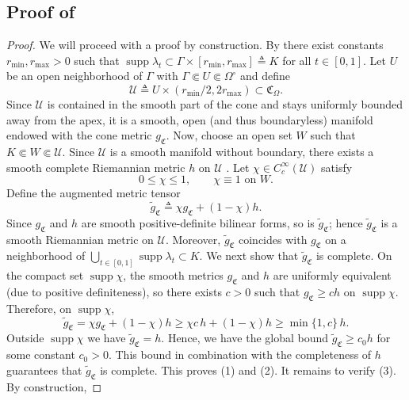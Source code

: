 \documentclass[11pt]{article}
\begin{document}
\subsection{Proof of } \label{sec: proof of cone ambient manifold}
\begin{proof}
    We will proceed with a proof by construction. By  there exist constants $r_{\min}, r_{\max} > 0$ such that $\operatorname{supp} \lambda_t \subset \Gamma \times[r_{\min}, r_{\max}] \triangleq K$ for all $t \in [0,1]$. Let $U$ be an open neighborhood of $\Gamma$ with $\Gamma \Subset U \Subset \Omega^\circ$ and define 
    \[\mathcal{U} \triangleq U \times (r_{\min}/2,2 r_{\max}) \subset \mathfrak{C}_\Omega.\]
    Since $\mathcal{U}$ is contained in the smooth part of the cone and stays uniformly bounded away from the apex, it is a smooth, open (and thus boundaryless) manifold endowed with the cone metric $g_\mathfrak{C}$. Now, choose an open set $W$ such that $K \Subset W \Subset \mathcal U$. Since $\mathcal U$ is a smooth manifold without boundary, there exists a smooth complete
    Riemannian metric $h$ on $\mathcal U$ \citep{nomizu1961existence}. Let $\chi \in C_c^\infty(\mathcal U)$ satisfy
    \[
    0 \leq \chi \leq 1, \qquad \chi \equiv 1 \text{ on } W.
    \]
    Define the augmented metric tensor
    \[
    \widetilde g_{\mathfrak C} \triangleq \chi g_{\mathfrak C} + (1-\chi)h.
    \]
    Since $g_{\mathfrak C}$ and $h$ are smooth positive-definite bilinear forms, so is
    $\widetilde g_{\mathfrak C}$; hence $\widetilde g_{\mathfrak C}$ is a smooth Riemannian metric
    on $\mathcal U$. Moreover, $\widetilde g_\mathfrak{C}$ coincides with $g_\mathfrak{C}$ on  a neighborhood of
    $\bigcup_{t\in[0,1]}\operatorname{supp}\lambda_t \subset K$. We next show that $\widetilde g_{\mathfrak C}$ is complete. On the compact set
    $\operatorname{supp}\chi$, the smooth metrics $g_{\mathfrak C}$ and $h$ are uniformly equivalent (due to positive definiteness),
    so there exists $c>0$ such that
    $g_{\mathfrak C} \geq c h$ on $\operatorname{supp}\chi.$ Therefore, on $\operatorname{supp}\chi$,
    \[
    \widetilde g_{\mathfrak C}
    = \chi g_{\mathfrak C} + (1-\chi)h
    \geq \chi c\, h + (1-\chi)h
    \geq \min\{1,c\}\, h.
    \]
    Outside $\operatorname{supp}\chi$ we have $\widetilde g_{\mathfrak C}=h$. Hence, we have the global bound $\widetilde g_{\mathfrak C} \geq c_0 h$ for some constant $c_0 > 0$. This bound in combination with the completeness of $h$ guarantees that $\tilde g_\mathfrak{C}$ is complete. This proves (1) and (2). It remains to verify (3). By construction,

\end{proof}
\end{document}
